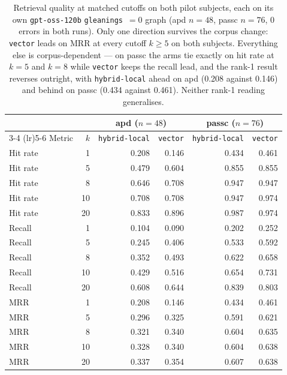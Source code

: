 \begin{table}[htbp]
  \centering
  \caption{Retrieval quality at matched cutoffs on both pilot subjects, each on its own
    \texttt{gpt-oss-120b} \texttt{gleanings}~$=0$ graph (apd $n=48$, passc $n=76$, 0 errors in both
    runs). Only one direction survives the corpus change: \texttt{vector} leads on MRR at every
    cutoff $k \ge 5$ on both subjects. Everything else is corpus-dependent --- on passc the arms
    tie exactly on hit rate at $k=5$ and $k=8$ while \texttt{vector} keeps the recall lead, and the
    rank-1 result reverses outright, with \texttt{hybrid-local} ahead on apd (0.208 against 0.146)
    and behind on passc (0.434 against 0.461). Neither rank-1 reading generalises.}
  \label{tab:retrieval-quality-two-subjects}
  \begin{tabular}{lrrrrr}
    \toprule
    & & \multicolumn{2}{c}{apd ($n=48$)} & \multicolumn{2}{c}{passc ($n=76$)} \\
    \cmidrule(lr){3-4} \cmidrule(lr){5-6}
    Metric & $k$ & \texttt{hybrid-local} & \texttt{vector} & \texttt{hybrid-local} & \texttt{vector} \\
    \midrule
    Hit rate &  1 & 0.208 & 0.146 & 0.434 & 0.461 \\
    Hit rate &  5 & 0.479 & 0.604 & 0.855 & 0.855 \\
    Hit rate &  8 & 0.646 & 0.708 & 0.947 & 0.947 \\
    Hit rate & 10 & 0.708 & 0.708 & 0.947 & 0.974 \\
    Hit rate & 20 & 0.833 & 0.896 & 0.987 & 0.974 \\
    \midrule
    Recall &  1 & 0.104 & 0.090 & 0.202 & 0.252 \\
    Recall &  5 & 0.245 & 0.406 & 0.533 & 0.592 \\
    Recall &  8 & 0.352 & 0.493 & 0.622 & 0.658 \\
    Recall & 10 & 0.429 & 0.516 & 0.654 & 0.731 \\
    Recall & 20 & 0.608 & 0.644 & 0.839 & 0.803 \\
    \midrule
    MRR &  1 & 0.208 & 0.146 & 0.434 & 0.461 \\
    MRR &  5 & 0.296 & 0.325 & 0.591 & 0.621 \\
    MRR &  8 & 0.321 & 0.340 & 0.604 & 0.635 \\
    MRR & 10 & 0.328 & 0.340 & 0.604 & 0.638 \\
    MRR & 20 & 0.337 & 0.354 & 0.607 & 0.638 \\
    \bottomrule
  \end{tabular}


\end{table}
